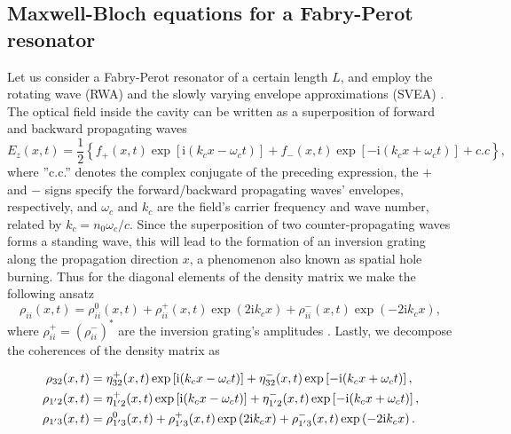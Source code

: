 \documentclass[10pt]{article}
\begin{document}
\begin{appendices}
	
	\section{Maxwell-Bloch equations for a Fabry-Perot resonator}
	\label{sec:MBFP}
	Let us consider a Fabry-Perot resonator of a
	certain length $L$, and employ the rotating wave (RWA) and the slowly varying
	envelope approximations (SVEA) \cite{boyd2003nonlinear,gordon2008multimode}.
	The optical field inside the cavity can be written as a superposition of
	forward and backward propagating waves
	\begin{equation}
	E_{z}(x,t)=\frac{1}{2}\left\{  f_{+}(x,t)\exp\left [  \mathrm{i}(k_{c}%
	x-\omega_{c}t)\right ]  +f_{-}(x,t)\exp\left [ -\mathrm{i}(k_{c}x+\omega
	_{c}t)\right ]  +c.c\right\}  , \label{eq:e-ansatz}%
	\end{equation}
	where ''c.c.'' denotes the complex conjugate of the preceding expression, the
	$+$ and $-$ signs specify the forward/backward propagating waves' envelopes,
	respectively, and $\omega_{c}$ and $k_{c}$ are the field's carrier frequency
	and wave number, related by $k_{c}=n_{0}\omega_{c}/c$. Since the superposition
	of two counter-propagating waves forms a standing wave, this will lead to the
	formation of an inversion grating along the propagation direction $x$, a
	phenomenon also known as spatial hole burning. Thus for the diagonal elements
	of the density matrix we make the following ansatz
	\begin{equation}
	\rho_{ii}(x,t)=\rho_{ii}^{0}(x,t)+\rho_{ii}^{+}(x,t)\exp\left(  2\mathrm{i}%
	k_{c}x\right)  +\rho_{ii}^{-}(x,t)\exp\left(  -2\mathrm{i}k_{c}x\right)  ,
	\label{eq:ii-ansatz}%
	\end{equation}
	where $\rho_{ii}^{+}=(\rho_{ii}^{-})^{\ast}$ are the inversion grating's
	amplitudes \cite{wang2007coherent}. Lastly, we decompose the coherences of the
	density matrix as 
	
	\begin{subequations}
		\centering
		\label{eq:cohansatz}%
		\begin{align}
		\rho_{32}(x,t)  &  =\eta_{32}^{+}(x,t)\exp\left[  \mathrm{i}(k_{c}x-\omega
		_{c}t)\right]  +\eta_{32}^{-}(x,t)\exp\left[  -\mathrm{i}(k_{c}x+\omega
		_{c}t)\right]  ,\label{eq:32ansatz}\\
		\rho_{1^{\prime}2}(x,t)  &  =\eta_{1^{\prime}2}^{+}(x,t)\exp\left[
		\mathrm{i}(k_{c}x-\omega_{c}t)\right]  +\eta_{1^{\prime}2}^{-}(x,t)\exp\left[
		-\mathrm{i}(k_{c}x+\omega_{c}t)\right]  ,\label{eq:12ansatz}\\
		\rho_{1^{\prime}3}(x,t)  &  =\rho_{1^{\prime}3}^{0}(x,t)+\rho_{1^{\prime}%
			3}^{+}(x,t)\exp\left(  2\mathrm{i}k_{c}x\right)  +\rho_{1^{\prime}3}%
		^{-}(x,t)\exp\left(  -2\mathrm{i}k_{c}x\right)  . \label{eq:13ansatz}%
		\end{align}
	\end{subequations}
	

\end{appendices}
\end{document}
